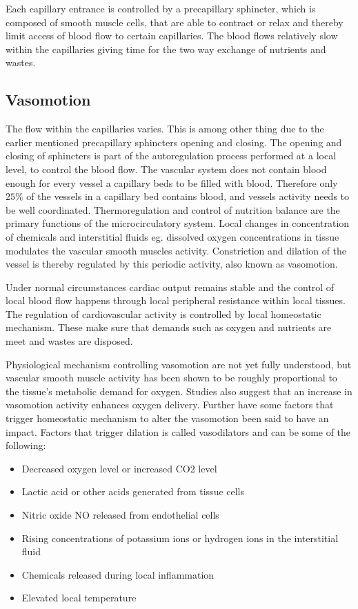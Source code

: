 Each capillary entrance is controlled by a precapillary sphincter, which is composed of smooth muscle cells, that are able to contract or relax and thereby limit access of blood flow to certain capillaries. The blood flows relatively slow within the capillaries giving time for the two way exchange of nutrients and wastes. \cite{martini2012}

\subsection{Vasomotion}

The flow within the capillaries varies. This is among other thing due to the earlier mentioned precapillary sphincters opening and closing. The opening and closing of sphincters is part of the autoregulation process performed at a local level, to control the blood flow. The vascular system does not contain blood enough for every vessel a capillary beds to be filled with blood. Therefore only $25\%$ of the vessels in a capillary bed contains blood, and vessels activity needs to be well coordinated. Thermoregulation and control of nutrition balance are the primary functions of the microcirculatory system. Local changes in concentration of chemicals and interstitial fluids eg. dissolved oxygen concentrations in tissue modulates the vascular smooth muscles activity. Constriction and dilation of the vessel is thereby regulated by this periodic activity, also known as vasomotion. \cite{martini2012,geyer2004}

Under normal circumstances cardiac output remains stable and the control of local blood flow happens through local peripheral resistance within local tissues. The regulation of cardiovascular activity is controlled by local homeostatic mechanism. These make sure that demands such as oxygen and nutrients are meet and wastes are disposed.\cite{martini2012}

Physiological mechanism controlling vasomotion are not yet fully understood, but vascular smooth muscle activity has been shown to be roughly proportional to the tissue’s metabolic demand for oxygen.\cite{geyer2004} Studies also suggest that an increase in vasomotion activity enhances oxygen delivery\cite{goldman2001}. Further have some factors that trigger homeostatic mechanism to alter the vasomotion been said to have an impact. Factors that trigger dilation is called vasodilators and can be some of the following:\cite{martini2012,geyer2004}  
\begin{itemize}
	\item Decreased oxygen level or increased CO2 level
	\item Lactic acid or other acids generated from tissue cells
	\item Nitric oxide NO released from endothelial cells
	\item Rising concentrations of potassium ions or hydrogen ions in the interstitial fluid
	\item Chemicals released during local inflammation
	\item Elevated local temperature
\end{itemize} 

